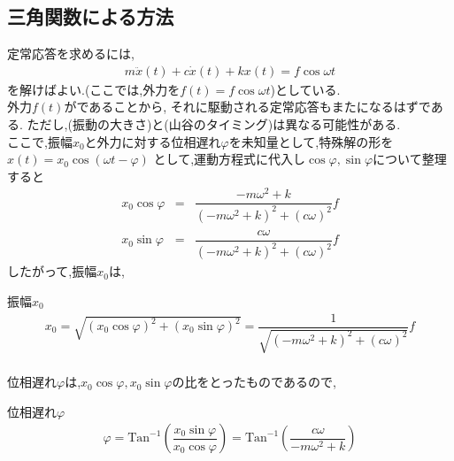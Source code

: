 \documentclass[a4paper]{jsarticle}
\begin{document}
\subsection{三角関数による方法}
定常応答を求めるには,
\begin{eqnarray*}
    m \ddot{x}\left(t\right)+c\dot{x}\left(t\right)+kx\left(t\right)=f\cos\omega t
\end{eqnarray*}
を解けばよい.(ここでは,外力を$f\left(t\right)=f\cos\omega t$)としている.\\
外力$f\left(t\right)$がであることから,
それに駆動される定常応答もまたになるはずである.
ただし,(振動の大きさ)と(山谷のタイミング)は異なる可能性がある.\\
ここで,振幅$x_0$と外力に対する位相遅れ$\varphi$を未知量として,特殊解の形を$x\left(t\right)=x_0\cos\left(\omega t-\varphi\right)$
として,運動方程式に代入し$\cos\varphi,\sin\varphi$について整理すると
\begin{eqnarray*}
    x_0\cos\varphi&=&\dfrac{-m\omega^2+k}{\left(-m\omega^2+k\right)^2+\left(c\omega\right)^2}f\\
    x_0\sin\varphi&=&\dfrac{c\omega}{\left(-m\omega^2+k\right)^2+\left(c\omega\right)^2}f
\end{eqnarray*}
したがって,振幅$x_0$は,
\begin{itembox}[l]{振幅$x_0$}
    \begin{eqnarray*}
        x_0=\sqrt{\left(x_0\cos\varphi\right)^2+\left(x_0\sin\varphi\right)^2}=\dfrac{1}{\sqrt{\left(-m\omega^2+k\right)^2+\left(c\omega\right)^2}}f\\
    \end{eqnarray*}
\end{itembox}
位相遅れ$\varphi$は,$x_0\cos\varphi,x_0\sin\varphi$の比をとったものであるので,
\begin{itembox}[l]{位相遅れ$\varphi$}
    \begin{eqnarray*}
        \varphi=\mathrm{Tan}^{-1}\left(\dfrac{x_0\sin\varphi}{x_0\cos\varphi}\right)=\mathrm{Tan}^{-1}\left(\dfrac{c\omega}{-m\omega^2+k}\right)\\
    \end{eqnarray*}
\end{itembox}
\end{document}
